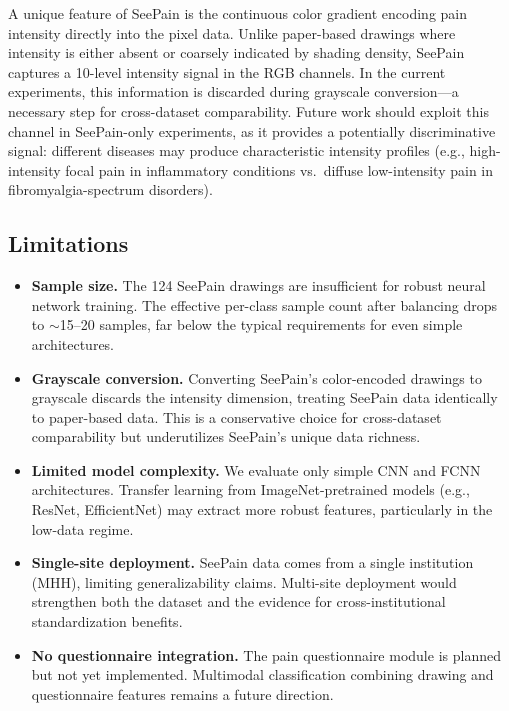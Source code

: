 \documentclass[conference]{IEEEtran}
\begin{document}
A unique feature of SeePain is the continuous color gradient encoding pain intensity directly into the pixel data. Unlike paper-based drawings where intensity is either absent or coarsely indicated by shading density, SeePain captures a 10-level intensity signal in the RGB channels. In the current experiments, this information is discarded during grayscale conversion—a necessary step for cross-dataset comparability. Future work should exploit this channel in SeePain-only experiments, as it provides a potentially discriminative signal: different diseases may produce characteristic intensity profiles (e.g., high-intensity focal pain in inflammatory conditions vs.\ diffuse low-intensity pain in fibromyalgia-spectrum disorders).

\subsection{Limitations}

\begin{itemize}
    \item \textbf{Sample size.} The 124 SeePain drawings are insufficient for robust neural network training. The effective per-class sample count after balancing drops to $\sim$15--20 samples, far below the typical requirements for even simple architectures.
    \item \textbf{Grayscale conversion.} Converting SeePain's color-encoded drawings to grayscale discards the intensity dimension, treating SeePain data identically to paper-based data. This is a conservative choice for cross-dataset comparability but underutilizes SeePain's unique data richness.
    \item \textbf{Limited model complexity.} We evaluate only simple CNN and FCNN architectures. Transfer learning from ImageNet-pretrained models (e.g., ResNet, EfficientNet) may extract more robust features, particularly in the low-data regime.
    \item \textbf{Single-site deployment.} SeePain data comes from a single institution (MHH), limiting generalizability claims. Multi-site deployment would strengthen both the dataset and the evidence for cross-institutional standardization benefits.
    \item \textbf{No questionnaire integration.} The pain questionnaire module is planned but not yet implemented. Multimodal classification combining drawing and questionnaire features remains a future direction.
\end{itemize}
\end{document}
